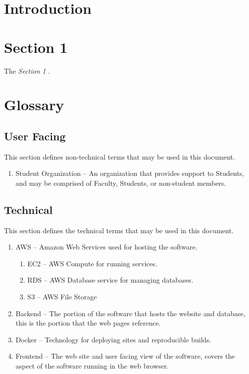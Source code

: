 \newcommand{\documentName}{TestRail Document}
\newcommand{\shortDocumentName}{TRD}





\firstPageBlock

\newpage %
\section{Introduction}

\newpage %
\section{Section 1}
The \textit{Section 1} .

\newpage %
\section{Glossary}
	\subsection{User Facing}
	This section defines non-technical terms that may be used in this document.
	\begin{enumerate}[leftmargin=3\parindent]
		\item Student Organization -- An organization that provides support to Students, and may be comprised of Faculty, Students, or non-student members.
	\end{enumerate}

	\subsection{Technical}
	This section defines the technical terms that may be used in this document.
	\begin{enumerate}[leftmargin=3\parindent]
		\item AWS -- Amazon Web Services used for hosting the software.
		\begin{enumerate}[leftmargin=3\parindent]
			\item EC2 -- AWS Compute for running services.
			\item RDS -- AWS Database service for managing databases.
			\item S3 -- AWS File Storage
		\end{enumerate}
		\item Backend -- The portion of the software that hosts the website and database, this is the portion that the web pages reference.
		\item Docker -- Technology for deploying sites and reproducible builds.
		\item Frontend -- The web site and user facing view of the software, covers the aspect of the software running in the web browser.
	\end{enumerate}

	\documentsGlossary



